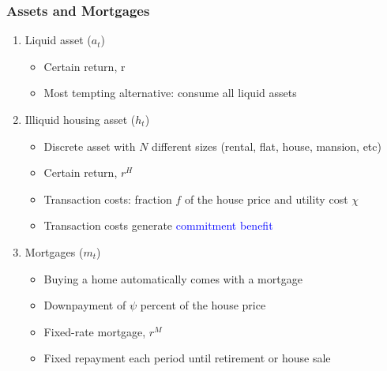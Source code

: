 \documentclass[10pt,english,t,10pt]{beamer}
\begin{document}
\begin{frame}
\frametitle{Assets and Mortgages}
\begin{enumerate}
\item Liquid asset ($a_t$)
\smallskip
\begin{itemize}
\item Certain return, r
\smallskip
\item Most tempting alternative: consume all liquid assets
\end{itemize}
\medskip \medskip \pause
\item Illiquid housing asset ($h_t$)
\smallskip
\begin{itemize}
\item Discrete asset with $N$ different sizes (rental, flat, house, mansion, etc)
\smallskip
\item Certain return, $r^H$
\smallskip
\item Transaction costs: fraction $f$ of the house price and utility cost $\chi$
\smallskip
\item Transaction costs generate \textcolor{blue}{commitment benefit}
\end{itemize}
\medskip \medskip
\pause
\item Mortgages ($m_t$)
\smallskip
\begin{itemize}
\item Buying a home automatically comes with a mortgage
\smallskip
\item Downpayment of $\psi$ percent of the house price
\smallskip
\item Fixed-rate mortgage, $r^M$
\smallskip
\item Fixed repayment each period until retirement or house sale
\end{itemize}
\end{enumerate}
\end{frame}
\end{document}
